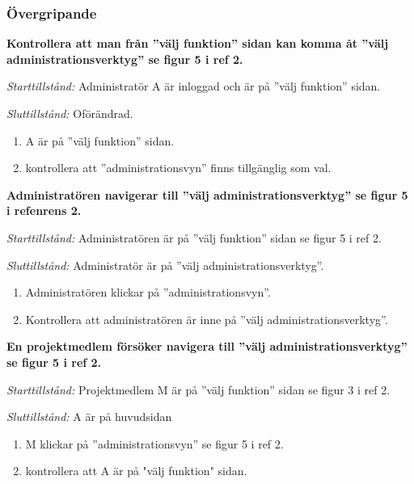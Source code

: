 \documentclass[a4paper]{article}
\begin{document}
\subsubsection{Övergripande}
\begin{FT}
\item %
\textbf{Kontrollera att man från ''välj funktion'' sidan kan komma åt ''välj administrationsverktyg'' se figur 5 i ref 2.}

\emph{Starttillstånd:}  Administratör A är inloggad och är på ''välj funktion'' sidan.

\emph{Sluttillstånd:} Oförändrad.

\begin{enumerate}
\item A är på ''välj funktion'' sidan.
\item kontrollera att ''administrationsvyn'' finns tillgänglig som val. 

\end{enumerate}

\item %
\textbf{Administratören navigerar till ''välj administrationsverktyg'' se figur 5 i refenrens 2.}

\emph{Starttillstånd:} Administratören är på ''välj funktion'' sidan se figur 5 i ref 2.

\emph{Sluttillstånd:} Administratör är på ''välj administrationsverktyg''.

\begin{enumerate}
\item Administratören klickar på ''administrationsvyn''.
\item Kontrollera att administratören är inne på ''välj administrationsverktyg''.
\end{enumerate}

\item %
\textbf{En projektmedlem försöker navigera till ''välj administrationsverktyg'' se figur 5 i ref 2.}

\emph{Starttillstånd:} Projektmedlem M är på ''välj funktion'' sidan se figur 3 i ref 2.

\emph{Sluttillstånd:} A är på huvudsidan

\begin{enumerate}
\item M klickar på ''administrationsvyn'' se figur 5 i ref 2.
\item kontrollera att A är på "välj funktion" sidan. 
\end{enumerate}


\end{FT}
\end{document}
